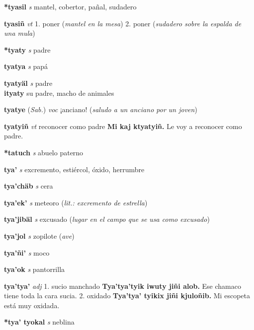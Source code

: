 \documentclass[10pt]{scrbook}
\newcommand{\entry}[1]{\textbf{#1}}
\newcommand{\onedefinition}[1]{#1.}
\newcommand{\partofspeech}[1]{\textit{#1}}
\newcommand{\spanishtranslation}[1]{#1}
\newcommand{\clarification}[1]{(\textit{#1})}
\newcommand{\cholexample}[1]{\textbf{#1}}
\newcommand{\exampletranslation}[1]{#1}
\newcommand{\relevantdialect}[1]{(\textit{#1})}
\newcommand{\secondaryentry}[1]{\\\textbf{#1}}
\newcommand{\secondtranslation}[1]{#1}
\begin{document}
\begin{multicols}{2}
\entry{*tyasil}
\partofspeech{s}
\spanishtranslation{mantel, cobertor, pañal, sudadero}

\entry{tyasiñ}
\partofspeech{vt}
\onedefinition{1}
\spanishtranslation{poner}
\clarification{mantel en la mesa}
\onedefinition{2}
\spanishtranslation{poner}
\clarification{sudadero sobre la espalda de una mula}

\entry{*tyaty}
\partofspeech{s}
\spanishtranslation{padre}

\entry{tyatya}
\partofspeech{s}
\spanishtranslation{papá}

\entry{tyatyäl}
\partofspeech{s}
\spanishtranslation{padre}
\secondaryentry{ityaty}
\secondtranslation{su padre, macho de animales}

\entry{tyatye}
\relevantdialect{Sab.}
\partofspeech{voc}
\spanishtranslation{¡anciano!}
\clarification{saludo a un anciano por un joven}

\entry{tyatyiñ}
\partofspeech{vt}
\spanishtranslation{reconocer como padre}
\cholexample{Mi kaj ktyatyiñ.}
\exampletranslation{Le voy a reconocer como padre.}

\entry{*tatuch}
\partofspeech{s}
\spanishtranslation{abuelo paterno}

\entry{tya'}
\partofspeech{s}
\spanishtranslation{excremento, estiércol, óxido, herrumbre}

\entry{tya'chäb}
\partofspeech{s}
\spanishtranslation{cera}

\entry{tya'ek'}
\partofspeech{s}
\spanishtranslation{meteoro}
\clarification{lit.: excremento de estrella}

\entry{tya'jibäl}
\partofspeech{s}
\spanishtranslation{excusado}
\clarification{lugar en el campo que se usa como excusado}

\entry{tya'jol}
\partofspeech{s}
\spanishtranslation{zopilote}
\clarification{ave}

\entry{tya'ñi'}
\partofspeech{s}
\spanishtranslation{moco}

\entry{tya'ok}
\partofspeech{s}
\spanishtranslation{pantorrilla}

\entry{tya'tya'}
\partofspeech{adj}
\onedefinition{1}
\spanishtranslation{sucio}
\spanishtranslation{manchado}
\cholexample{Tya'tya'tyik iwuty jiñi alob.}
\exampletranslation{Ese chamaco tiene toda la cara sucia.}
\onedefinition{2}
\spanishtranslation{oxidado}
\cholexample{Tya'tya' tyikix jiñi kjuloñib.}
\exampletranslation{Mi escopeta está muy oxidada.}

\entry{*tya' tyokal}
\partofspeech{s}
\spanishtranslation{neblina}


\end{multicols}
\end{document}
